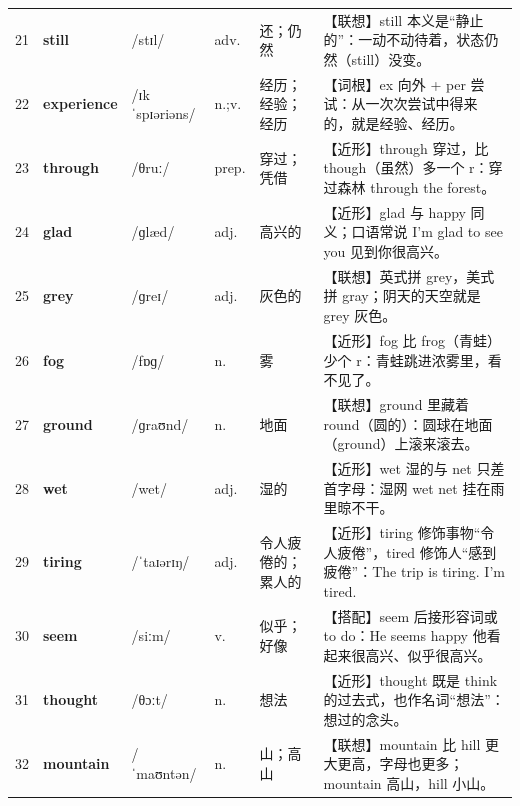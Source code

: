 \documentclass[UTF8,a4paper,11pt,oneside]{ctexbook}
\newcommand{\cellword}[1]{{\bfseries\textcolor{wordcol}{#1}}}
\newcommand{\cellipa}[1]{{\footnotesize\textcolor{ipacol}{#1}}}
\newcommand{\cellpos}[1]{\textcolor{poscol}{#1}}
\newcommand{\cellno}[1]{\textcolor{volcolor!75!black}{#1}}
\begin{document}
{\begin{longtable}{@{}C{0.045\textwidth}L{0.155\textwidth}L{0.175\textwidth}C{0.070\textwidth}L{0.180\textwidth}L{0.282\textwidth}@{}}
 \cellno{21} & \cellword{still} & \cellipa{/stɪl/} & \cellpos{adv.} & 还；仍然 & \textcolor{tagAssoc}{【联想】}still 本义是“静止的”：一动不动待着，状态仍然（still）没变。 \\
\cellno{22} & \cellword{experience} & \cellipa{/ɪkˈspɪəriəns/} & \cellpos{n.;\allowbreak{}v.} & 经历；经验；经历 & \textcolor{tagRoot}{【词根】}ex 向外 + per 尝试：从一次次尝试中得来的，就是经验、经历。 \\
 \cellno{23} & \cellword{through} & \cellipa{/θruː/} & \cellpos{prep.} & 穿过；凭借 & \textcolor{tagNear}{【近形】}through 穿过，比 though（虽然）多一个 r：穿过森林 through the forest。 \\
\cellno{24} & \cellword{glad} & \cellipa{/ɡlæd/} & \cellpos{adj.} & 高兴的 & \textcolor{tagNear}{【近形】}glad 与 happy 同义；口语常说 I'm glad to see you 见到你很高兴。 \\
 \cellno{25} & \cellword{grey} & \cellipa{/ɡreɪ/} & \cellpos{adj.} & 灰色的 & \textcolor{tagAssoc}{【联想】}英式拼 grey，美式拼 gray；阴天的天空就是 grey 灰色。 \\
\cellno{26} & \cellword{fog} & \cellipa{/fɒɡ/} & \cellpos{n.} & 雾 & \textcolor{tagNear}{【近形】}fog 比 frog（青蛙）少个 r：青蛙跳进浓雾里，看不见了。 \\
 \cellno{27} & \cellword{ground} & \cellipa{/ɡraʊnd/} & \cellpos{n.} & 地面 & \textcolor{tagAssoc}{【联想】}ground 里藏着 round（圆的）：圆球在地面（ground）上滚来滚去。 \\
\cellno{28} & \cellword{wet} & \cellipa{/wet/} & \cellpos{adj.} & 湿的 & \textcolor{tagNear}{【近形】}wet 湿的与 net 只差首字母：湿网 wet net 挂在雨里晾不干。 \\
 \cellno{29} & \cellword{tiring} & \cellipa{/ˈtaɪərɪŋ/} & \cellpos{adj.} & 令人疲倦的；累人的 & \textcolor{tagNear}{【近形】}tiring 修饰事物“令人疲倦”，tired 修饰人“感到疲倦”：The trip is tiring. I'm tired. \\
\cellno{30} & \cellword{seem} & \cellipa{/siːm/} & \cellpos{v.} & 似乎；好像 & \textcolor{tagColloc}{【搭配】}seem 后接形容词或 to do：He seems happy 他看起来很高兴、似乎很高兴。 \\
 \cellno{31} & \cellword{thought} & \cellipa{/θɔːt/} & \cellpos{n.} & 想法 & \textcolor{tagNear}{【近形】}thought 既是 think 的过去式，也作名词“想法”：想过的念头。 \\
\cellno{32} & \cellword{mountain} & \cellipa{/ˈmaʊntən/} & \cellpos{n.} & 山；高山 & \textcolor{tagAssoc}{【联想】}mountain 比 hill 更大更高，字母也更多；mountain 高山，hill 小山。 \\

\end{longtable}}
\end{document}
